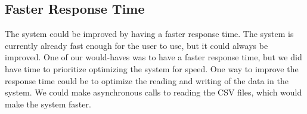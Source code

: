 \subsection{Faster Response Time}\label{subsec:faster-response-time}

The system could be improved by having a faster response time.
The system is currently already fast enough for the user to use, but it could always be improved.
One of our would-haves was to have a faster response time, but we did have time to prioritize optimizing the system
for speed.
One way to improve the response time could be to optimize the reading and writing of the data in the system.
We could make asynchronous calls to reading the CSV files, which would make the system faster.
